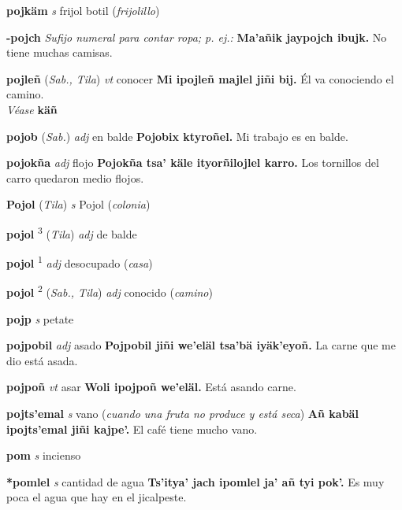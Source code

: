 \documentclass[10pt]{scrbook}
\newcommand{\entry}[1]{\textbf{#1}}
\newcommand{\defsuperscript}[1]{\textsuperscript{#1}}
\newcommand{\nontranslationdef}[1]{\textit{#1}}
\newcommand{\partofspeech}[1]{\textit{#1}}
\newcommand{\spanishtranslation}[1]{#1}
\newcommand{\clarification}[1]{(\textit{#1})}
\newcommand{\cholexample}[1]{\textbf{#1}}
\newcommand{\exampletranslation}[1]{#1}
\newcommand{\alsosee}[1]{\\\textit{Véase} \textbf{#1}}
\newcommand{\relevantdialect}[1]{(\textit{#1})}
\begin{document}
\begin{multicols}{2}
\entry{pojkäm}
\partofspeech{s}
\spanishtranslation{frijol botil}
\clarification{frijolillo}

\entry{-pojch}
\nontranslationdef{Sufijo numeral para contar ropa; p. ej.:}
\cholexample{Ma'añik jaypojch ibujk.}
\exampletranslation{No tiene muchas camisas.}

\entry{pojleñ}
\relevantdialect{Sab., Tila}
\partofspeech{vt}
\spanishtranslation{conocer}
\cholexample{Mi ipojleñ majlel jiñi bij.}
\exampletranslation{Él va conociendo el camino.}
\alsosee{käñ}

\entry{pojob}
\relevantdialect{Sab.}
\partofspeech{adj}
\spanishtranslation{en balde}
\cholexample{Pojobix ktyroñel.}
\exampletranslation{Mi trabajo es en balde.}

\entry{pojokña}
\partofspeech{adj}
\spanishtranslation{flojo}
\cholexample{Pojokña tsa' käle ityorñilojlel karro.}
\exampletranslation{Los tornillos del carro quedaron medio flojos.}

\entry{Pojol}
\relevantdialect{Tila}
\partofspeech{s}
\spanishtranslation{Pojol}
\clarification{colonia}

\entry{pojol}
\defsuperscript{3}
\relevantdialect{Tila}
\partofspeech{adj}
\spanishtranslation{de balde}

\entry{pojol}
\defsuperscript{1}
\partofspeech{adj}
\spanishtranslation{desocupado}
\clarification{casa}

\entry{pojol}
\defsuperscript{2}
\relevantdialect{Sab., Tila}
\partofspeech{adj}
\spanishtranslation{conocido}
\clarification{camino}

\entry{pojp}
\partofspeech{s}
\spanishtranslation{petate}

\entry{pojpobil}
\partofspeech{adj}
\spanishtranslation{asado}
\cholexample{Pojpobil jiñi we'eläl tsa'bä iyäk'eyoñ.}
\exampletranslation{La carne que me dio está asada.}

\entry{pojpoñ}
\partofspeech{vt}
\spanishtranslation{asar}
\cholexample{Woli ipojpoñ we'eläl.}
\exampletranslation{Está asando carne.}

\entry{pojts'emal}
\partofspeech{s}
\spanishtranslation{vano}
\clarification{cuando una fruta no produce y está seca}
\cholexample{Añ kabäl ipojts'emal jiñi kajpe'.}
\exampletranslation{El café tiene mucho vano.}

\entry{pom}
\partofspeech{s}
\spanishtranslation{incienso}

\entry{*pomlel}
\partofspeech{s}
\spanishtranslation{cantidad de agua}
\cholexample{Ts'itya' jach ipomlel ja' añ tyi pok'.}
\exampletranslation{Es muy poca el agua que hay en el jicalpeste.}


\end{multicols}
\end{document}
